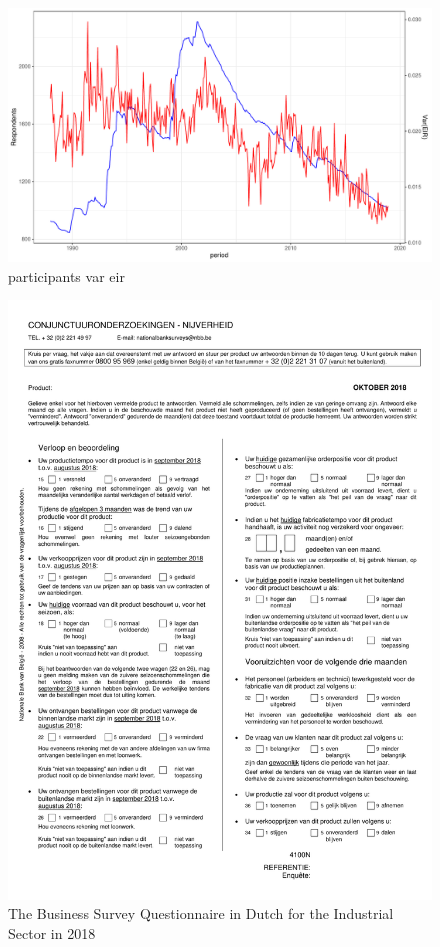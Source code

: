 \documentclass[12pt,a4paper,oneside]{book}
\begin{document}
\begin{figure}[H]
    \centering
    \includegraphics[scale=0.5]{Graphs/participants_var_eir.pdf}
    \caption{participants var eir}
    \label{fig:participants var eir}
\end{figure}




\newpage
\begin{figure}[H]
    \centering
    \includegraphics[scale=0.75]{Images/IndustryN.pdf}
    \caption{The Business Survey Questionnaire in Dutch for the Industrial Sector in 2018}
    \label{Questionnaire2018}
\end{figure}
\end{document}

